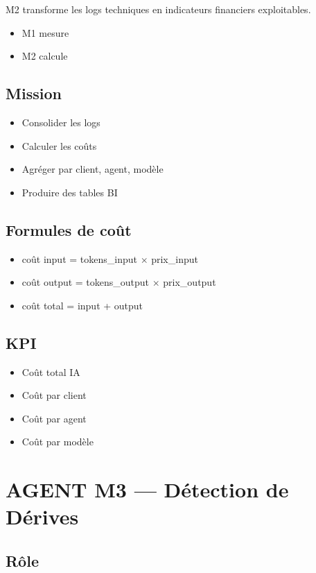 \documentclass[11pt,a4paper]{article}
\begin{document}
M2 transforme les logs techniques en indicateurs financiers exploitables.

\begin{itemize}
\item M1 mesure
\item M2 calcule
\end{itemize}

\subsection{Mission}

\begin{itemize}
\item Consolider les logs
\item Calculer les coûts
\item Agréger par client, agent, modèle
\item Produire des tables BI
\end{itemize}

\subsection{Formules de coût}

\begin{itemize}
\item coût input = tokens\_input $\times$ prix\_input
\item coût output = tokens\_output $\times$ prix\_output
\item coût total = input + output
\end{itemize}

\subsection{KPI}

\begin{itemize}
\item Coût total IA
\item Coût par client
\item Coût par agent
\item Coût par modèle
\end{itemize}

\newpage

\section{AGENT M3 --- Détection de Dérives}

\subsection{Rôle}
\end{document}
